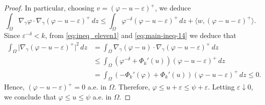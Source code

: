 \documentclass[11pt]{article}
\newcommand{\om} {\Omega}
\newcommand{\gradgr}{\nabla_{\gamma}}
\begin{document}
\begin{proof}
In particular, choosing $v = (\varphi - u - \varepsilon)^+$, we deduce
\begin{equation}
\label{eq:main-ineq-14}
\int_\Omega
\gradgr \varphi \cdot
\gradgr (\varphi - u - \varepsilon)^+ \, dz
\le
\int_\Omega
\varphi^{-\delta} (\varphi - u - \varepsilon)^+ \, dz
+
\langle w , (\varphi - u - \varepsilon)^+ \rangle .
\end{equation}
Since $\varepsilon^{-\delta} < k$, from \eqref{eq:ineq_eleven1} and \eqref{eq:main-ineq-14} we deduce that
\begin{equation*}
\begin{aligned}
\int_\Omega
\bigl| \gradgr (\varphi - u - \varepsilon)^+ \bigr|^2 \, dz
&=
\int_\Omega
\gradgr (\varphi - u)
\cdot
\gradgr (\varphi - u - \varepsilon)^+ \, dz
\\
&\le
\int_\Omega
\left( \varphi^{-\delta} + \Phi_k'(u) \right)
(\varphi - u - \varepsilon)^+ \, dz
\\
&=
\int_\Omega
\left(
- \Phi_k'(\varphi) + \Phi_k'(u)
\right)
(\varphi - u - \varepsilon)^+ \, dz \leq 0.
\end{aligned}
\end{equation*}
Hence, $(\varphi - u - \varepsilon)^+ = 0$ a.e. in $\om$. Therefore, $\varphi \le u + \varepsilon \le \psi + \varepsilon $. Letting $\varepsilon \downarrow 0$, we conclude that $\varphi \le u \le \psi$ a.e. in $\om$.
\end{proof}
\end{document}
